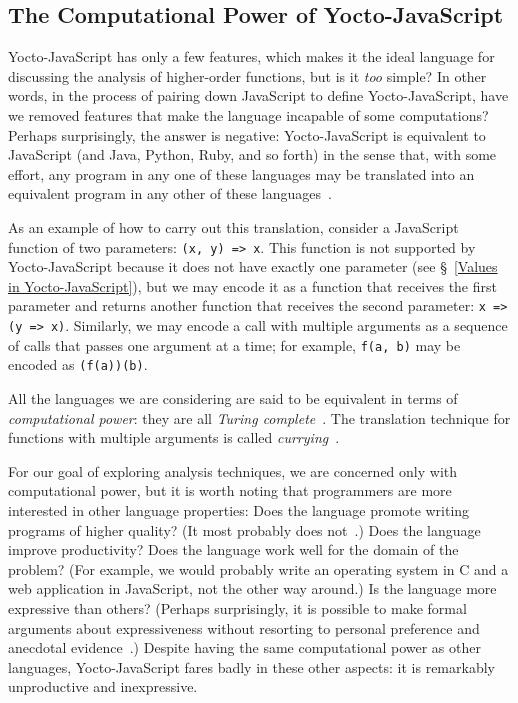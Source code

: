 \documentclass[12pt, oneside]{book}
\begin{document}
\begin{mdframed}[frametitle = {Advanced}]

\subsection{The Computational Power of Yocto-JavaScript}
\label{The Computational Power of Yocto-JavaScript}

Yocto-JavaScript has only a few features, which makes it the ideal language for discussing the analysis of higher-order functions, but is it \emph{too} simple? In other words, in the process of pairing down JavaScript to define Yocto-JavaScript, have we removed features that make the language incapable of some computations? Perhaps surprisingly, the answer is negative: Yocto-JavaScript is equivalent to JavaScript (and Java, Python, Ruby, and so forth) in the sense that, with some effort, any program in any one of these languages may be translated into an equivalent program in any other of these languages~\cite[§~6]{understanding-computation}.

As an example of how to carry out this translation, consider a JavaScript function of two parameters: \texttt{(x, y) => x}. This function is not supported by Yocto-JavaScript because it does not have exactly one parameter (see §~\ref{Values in Yocto-JavaScript}), but we may encode it as a function that receives the first parameter and returns another function that receives the second parameter: \texttt{x => (y => x)}. Similarly, we may encode a call with multiple arguments as a sequence of calls that passes one argument at a time; for example, \texttt{f(a, b)} may be encoded as \texttt{(f(a))(b)}.

\begin{mdframed}[frametitle = {Technical Terms}]
All the languages we are considering are said to be equivalent in terms of \emph{computational power}: they are all \emph{Turing complete}~\cite[§~7]{understanding-computation}. The translation technique for functions with multiple arguments is called \emph{currying}~\cite[page~163]{understanding-computation}.
\end{mdframed}

For our goal of exploring analysis techniques, we are concerned only with computational power, but it is worth noting that programmers are more interested in other language properties: Does the language promote writing programs of higher quality? (It most probably does not~\cite{code-quality}.) Does the language improve productivity? Does the language work well for the domain of the problem? (For example, we would probably write an operating system in C and a web application in JavaScript, not the other way around.) Is the language more expressive than others? (Perhaps surprisingly, it is possible to make formal arguments about expressiveness without resorting to personal preference and anecdotal evidence~\cite{expressive-power}.) Despite having the same computational power as other languages, Yocto-JavaScript fares badly in these other aspects: it is remarkably unproductive and inexpressive.


\end{mdframed}
\end{document}
